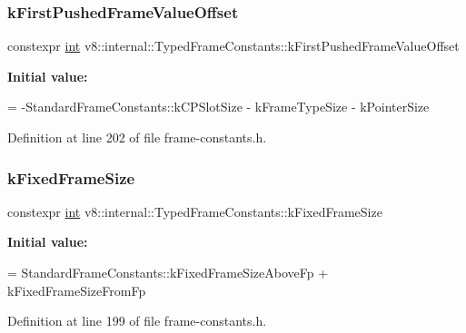 \subsubsection{\texorpdfstring{k\+First\+Pushed\+Frame\+Value\+Offset}{kFirstPushedFrameValueOffset}}
{\footnotesize\ttfamily constexpr \mbox{\hyperlink{classint}{int}} v8\+::internal\+::\+Typed\+Frame\+Constants\+::k\+First\+Pushed\+Frame\+Value\+Offset\hspace{0.3cm}{\ttfamily [static]}}

{\bfseries Initial value\+:}
\begin{DoxyCode}
=
      -StandardFrameConstants::kCPSlotSize - kFrameTypeSize - kPointerSize
\end{DoxyCode}


Definition at line 202 of file frame-\/constants.\+h.

\mbox{\label{classv8_1_1internal_1_1TypedFrameConstants_a3b904dfe5eb4c75f61640a40ce1595ab}} 
\subsubsection{\texorpdfstring{k\+Fixed\+Frame\+Size}{kFixedFrameSize}}
{\footnotesize\ttfamily constexpr \mbox{\hyperlink{classint}{int}} v8\+::internal\+::\+Typed\+Frame\+Constants\+::k\+Fixed\+Frame\+Size\hspace{0.3cm}{\ttfamily [static]}}

{\bfseries Initial value\+:}
\begin{DoxyCode}
=
      StandardFrameConstants::kFixedFrameSizeAboveFp + kFixedFrameSizeFromFp
\end{DoxyCode}


Definition at line 199 of file frame-\/constants.\+h.

\mbox{\label{classv8_1_1internal_1_1TypedFrameConstants_affde7d46e07f1bb222efe83ccac6de69}} 
